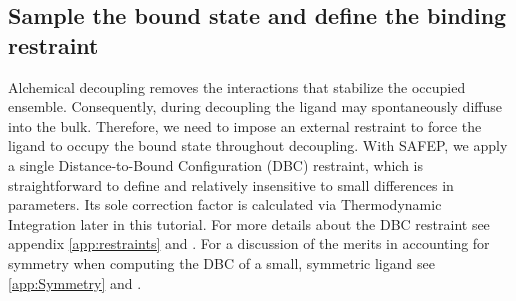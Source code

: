 \documentclass[9pt,tutorial]{Styling/livecoms}
\begin{document}
\subsection{Sample the bound state and define the binding restraint}\label{step:equilibrium}
    \begin{tcolorbox}[colback=blue!5!white,colframe=blue!75!black] 
    Alchemical decoupling removes the interactions that stabilize the occupied ensemble. Consequently, during decoupling the ligand may spontaneously diffuse into the bulk. 
    Therefore, we need to impose an external restraint to force the ligand to occupy the bound state throughout decoupling. With SAFEP, we apply a single Distance-to-Bound Configuration (DBC) restraint, which is straightforward to define and relatively insensitive to small differences in parameters. \cite{Salari2018} Its sole correction factor is calculated via Thermodynamic Integration later in this tutorial. For more details about the DBC restraint see appendix \ref{app:restraints} and \cite{Salari2018}. For a discussion of the merits in accounting for symmetry when computing the DBC of a small, symmetric ligand see \ref{app:Symmetry} and \cite{Ebrahimi2022}.
    \end{tcolorbox}
    
\end{document}
